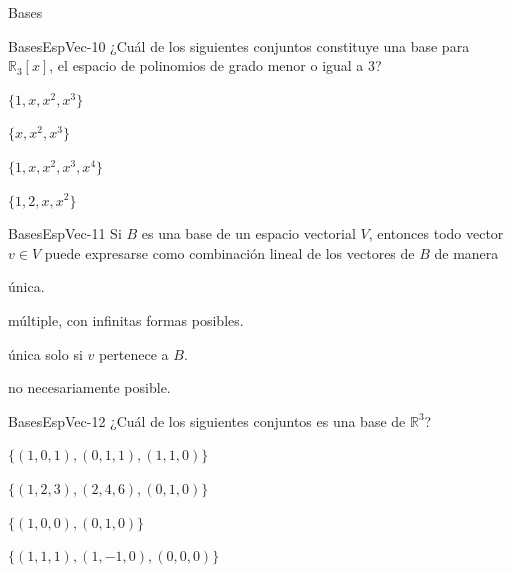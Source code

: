 \documentclass[a4,11pt]{aleph-notas}
\begin{document}
\begin{quiz}{Bases}
\begin{multi}[]%
    {BasesEspVec-10}
    ¿Cuál de los siguientes conjuntos constituye una base para \(\mathbb{R}_3[x]\), el espacio de polinomios de grado menor o igual a 3?
    \item* \(\{1,x,x^2,x^3\}\)
    \item \(\{x,x^2,x^3\}\)
    \item \(\{1,x,x^2,x^3,x^4\}\)
    \item \(\{1,2,x,x^2\}\)
\end{multi}

\begin{multi}[]%
    {BasesEspVec-11}
    Si \(B\) es una base de un espacio vectorial \(V\), entonces todo vector \(v\in V\) puede expresarse como combinación lineal de los vectores de \(B\) de manera
    \item* única.
    \item múltiple, con infinitas formas posibles.
    \item única solo si \(v\) pertenece a \(B\).
    \item no necesariamente posible.
\end{multi}

\begin{multi}[]%
    {BasesEspVec-12}
    ¿Cuál de los siguientes conjuntos es una base de \(\mathbb{R}^3\)?
    \item* \(\{(1,0,1),(0,1,1),(1,1,0)\}\)
    \item \(\{(1,2,3),(2,4,6),(0,1,0)\}\)
    \item \(\{(1,0,0),(0,1,0)\}\)
    \item \(\{(1,1,1),(1,-1,0),(0,0,0)\}\)
\end{multi}

\end{quiz}
\end{document}

